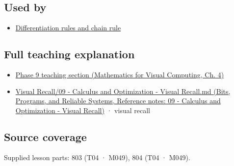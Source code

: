 \subsection{Used by}\label{appendix-fecc1847f5a3-used-by}

\hypertarget{appendix-fecc1847f5a3-used-by}{}

\begin{itemize}
\tightlist
\item
  \hyperref[appendix-d9f70bdfbc92]{Differentiation rules and chain rule}
\end{itemize}

\subsection{Full teaching explanation}\label{appendix-fecc1847f5a3-full-teaching-explanation}

\hypertarget{appendix-fecc1847f5a3-full-teaching-explanation}{}

\begin{itemize}
\tightlist
\item
  \href{../02-Mathematics-for-Visual-Computing/main.pdf\#nameddest=01-foundations-i-ch020-functions-limits-continuity-and-scalar-change}{Phase 9 teaching section (Mathematics for Visual Computing, Ch. 4)}
\item
  \href{../01-Bits-Programs-and-Reliable-Systems/main.pdf\#nameddest=appendix-adf48f5dc5c1}{Visual Recall/09 - Calculus and Optimization - Visual Recall.md (Bits, Programs, and Reliable Systems, Reference notes: 09 - Calculus and Optimization - Visual Recall)} · visual recall
\end{itemize}

\subsection{Source coverage}\label{appendix-fecc1847f5a3-source-coverage}

\hypertarget{appendix-fecc1847f5a3-source-coverage}{}

Supplied lesson parts: 803 (T04 · M049), 804 (T04 · M049).
